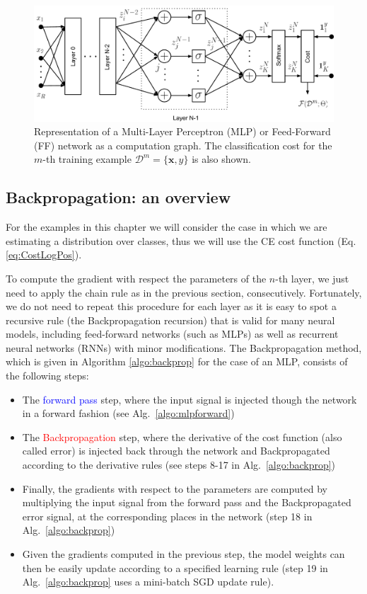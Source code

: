 \begin{figure}[!hb]
\centering
\includegraphics[scale=0.6]{figs/deep_learning/NN2.pdf}
\caption{Representation of a Multi-Layer Perceptron (MLP) or Feed-Forward (FF) network as a computation graph. The classification cost
for the $m$-th training example $\mathcal{D}^m=\{\mathbf{x}, y\}$ is also
shown.}
\label{fig:FF}
\end{figure}

\subsection{Backpropagation: an overview}

For the examples in this chapter we will consider the case in which we are
estimating a distribution over classes, thus we will use the CE cost function
(Eq. \ref{eq:CostLogPos}).

To compute the gradient with respect the parameters of the $n$-th layer, we
just need to apply the chain rule as in the previous section, consecutively.
Fortunately, we do not need to repeat this procedure for each layer as it is
easy to spot a recursive rule (the Backpropagation recursion) that is valid
for many neural models, including feed-forward networks (such as MLPs) as well
as recurrent neural networks (RNNs) with minor modifications. The
Backpropagation method, which is given in Algorithm \ref{algo:backprop} for
the case of an MLP, consists of the following steps:

\begin{itemize}
\item The \textcolor{blue}{forward pass} step, where the input signal is injected though the network  in a forward fashion (see Alg.~\ref{algo:mlpforward})
\item The \textcolor{red}{Backpropagation} step, where the derivative of the cost function (also called error) is injected back through the network and Backpropagated according to the derivative rules (see steps 8-17 in Alg.~\ref{algo:backprop})
\item Finally, the gradients with respect to the parameters are computed by multiplying the input signal from the forward pass and the Backpropagated error signal, at the corresponding places in the network (step 18 in Alg.~\ref{algo:backprop})
\item Given the gradients computed in the previous step, the model weights can then be easily update according to a specified learning rule (step 19 in Alg.~\ref{algo:backprop} uses a mini-batch SGD update rule).
\end{itemize}

